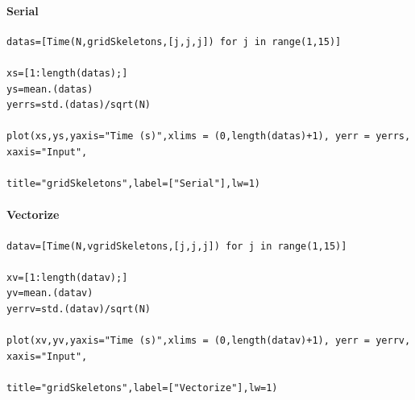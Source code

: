 \documentclass{article}
\begin{document}
\paragraph{Serial}
\begin{flushleft}\small
\begin{list}{}{} \item
    \begin{Verbatim}[tabsize=4]
datas=[Time(N,gridSkeletons,[j,j,j]) for j in range(1,15)]

xs=[1:length(datas);]
ys=mean.(datas)
yerrs=std.(datas)/sqrt(N)

plot(xs,ys,yaxis="Time (s)",xlims = (0,length(datas)+1), yerr = yerrs, xaxis="Input", 
                                                title="gridSkeletons",label=["Serial"],lw=1)
 \end{Verbatim}
\end{list}
\end{flushleft} 

\paragraph{Vectorize}
\begin{flushleft}\small
\begin{list}{}{} \item
    \begin{Verbatim}[tabsize=4]
datav=[Time(N,vgridSkeletons,[j,j,j]) for j in range(1,15)]

xv=[1:length(datav);]
yv=mean.(datav)
yerrv=std.(datav)/sqrt(N)

plot(xv,yv,yaxis="Time (s)",xlims = (0,length(datav)+1), yerr = yerrv, xaxis="Input", 
                                            title="gridSkeletons",label=["Vectorize"],lw=1)
    \end{Verbatim}
\end{list}
\end{flushleft}
\end{document}

